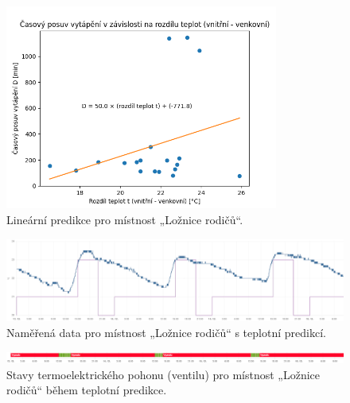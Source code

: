 \begin{figure}[H]
    \centering
    \includegraphics[width=0.8\textwidth]{images/testovani/teplotni-predikce/linearni-predikce.png}
    \caption{Lineární predikce pro místnost „Ložnice rodičů“.}
    \label{fig:linearni-predikce}
\end{figure}

\begin{figure}[H]
    \centering
    \includegraphics[width=\textwidth]{images/testovani/teplotni-predikce/teplotni-predikce-loznice-rodicu}
    \caption{Naměřená data pro místnost „Ložnice rodičů“ s teplotní predikcí.}
    \label{fig:teplotni-predikce-loznice-rodicu}
\end{figure}


\begin{figure}[H]
    \centering
    \includegraphics[width=\textwidth]{images/testovani/teplotni-predikce/teplotni-predikce-ventil-loznice-rodicu.png}
    \caption{Stavy termoelektrického pohonu (ventilu) pro místnost „Ložnice rodičů“ během teplotní predikce.}
    \label{fig:teplotni-predikce-ventil-loznice-rodicu}
\end{figure}


